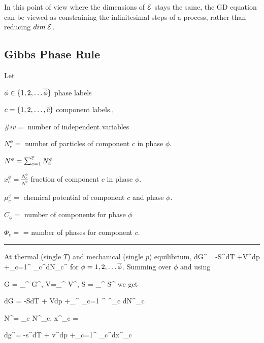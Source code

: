 In this point of view where the 
dimensions of ${\cal E}$ stays the same,
the GD equation can be viewed as 
constraining the infinitesimal steps of a process, rather than reducing $dim\; {\cal E}$.



\subsection{Gibbs Phase Rule}





Let 

$\phi\in \{ 1, 2, \ldots \overline{\phi}\}$  phase labels

$c=\{1, 2, \ldots, \overline{c}\}$ component labels.,

$\#iv=$ number of independent variables

$N_c^\phi=$ number of particles 
of component $c$ in phase $\phi$.

$N^\phi =\sum_{c=1}^{\overline{c}} N^\phi_c$

$x_c^\phi= \frac{N_c^\phi}
{N^\phi}$ fraction of component $c$
in phase $\phi$.

$\mu_c^\phi=$ chemical
potential of component $c$ and phase $\phi$. 

$C_\phi =$ number of components for phase $\phi$

$\Phi_c=$ = number of phases 
for component $c$.


\hrule
At thermal (single $T$) and mechanical (single $p$) equilibrium,
\beq
dG^\phi= -S^\phi dT +V^\phi dp +\sum_{c=1}^{} \mu_c^\phi  dN_c^\phi
\eeq
for $\phi=1, 2, \ldots \overline{\phi}$. Summing over $\phi$
and using

\beq
G = \sum_{}^{\ol{\phi}}
G^\phi,\quad
V=\sum_{}^{\ol{\phi}}
V^\phi,\quad
S = \sum_{}^{\ol{\phi}} S^\phi
\eeq
we get

\beq
dG = -SdT + Vdp +\sum_{}^{\ol{\phi}}
\sum_{c=1} ^{}
\mu^\phi_c dN^\phi_c
\eeq

\beq
N^\phi = \sum_c N^\phi_c,
\quad x^\phi_c = 
\eeq

\beq
dg^\phi = -s^\phi dT + v^\phi dp 
+\sum_{c=1}^{} \mu_c^\phi dx^\phi_c
\eeq






